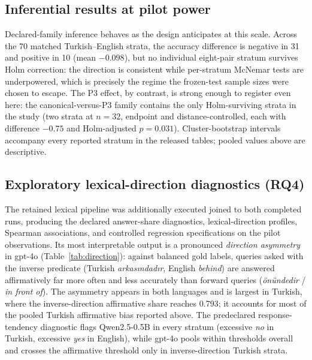 \subsection{Inferential results at pilot power}

Declared-family inference behaves as the design anticipates at this scale. Across the 70 matched
Turkish--English strata, the accuracy difference is negative in 31 and positive in 10 (mean $-0.098$), but
no individual eight-pair stratum survives Holm correction: the direction is consistent while per-stratum
McNemar tests are underpowered, which is precisely the regime the frozen-test sample sizes were chosen to
escape. The P3 effect, by contrast, is strong enough to register even here: the canonical-versus-P3
family contains the only Holm-surviving strata in the study (two strata at $n = 32$, endpoint and
distance-controlled, each with difference $-0.75$ and Holm-adjusted $p = 0.031$). Cluster-bootstrap
intervals accompany every reported stratum in the released tables; pooled values above are descriptive.

\subsection{Exploratory lexical-direction diagnostics (RQ4)}

The retained lexical pipeline was additionally executed joined to both completed runs, producing the
declared answer-share diagnostics, lexical-direction profiles, Spearman associations, and controlled
regression specifications on the pilot observations. Its most interpretable output is a pronounced
\emph{direction asymmetry} in gpt-4o (Table~\ref{tab:direction}): against balanced gold labels, queries
asked with the inverse predicate (Turkish \emph{arkasındadır}, English \emph{behind}) are answered
affirmatively far more often and less accurately than forward queries (\emph{önündedir} / \emph{in front
of}). The asymmetry appears in both languages and is largest in Turkish, where the inverse-direction
affirmative share reaches 0.793; it accounts for most of the pooled Turkish affirmative bias reported
above. The predeclared response-tendency diagnostic flags Qwen2.5-0.5B in every stratum (excessive
\emph{no} in Turkish, excessive \emph{yes} in English), while gpt-4o pools within thresholds overall and
crosses the affirmative threshold only in inverse-direction Turkish strata.

